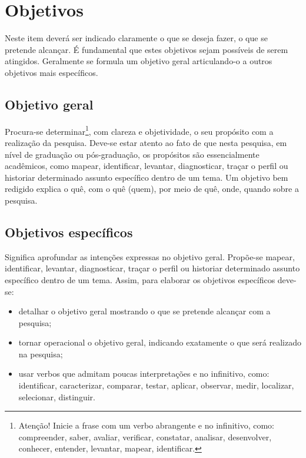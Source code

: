 \section{Objetivos}

Neste item deverá ser indicado claramente o que se deseja fazer, o que se pretende alcançar. É fundamental que estes objetivos sejam possíveis de serem atingidos. Geralmente se formula um objetivo geral articulando-o a outros objetivos mais específicos.

\subsection{Objetivo geral}

Procura-se determinar\footnote{Atenção! Inicie a frase com um verbo abrangente e no infinitivo, como: compreender, saber, avaliar, verificar, constatar, analisar, desenvolver, conhecer, entender, levantar, mapear, identificar.}, com clareza e objetividade, o seu propósito com a realização da pesquisa. Deve-se estar atento ao fato de que nesta pesquisa, em nível de graduação ou pós-graduação, os propósitos são essencialmente acadêmicos, como mapear, identificar, levantar, diagnosticar, traçar o perfil ou historiar determinado assunto específico dentro de um tema. Um objetivo bem redigido explica o quê, com o quê (quem), por meio de quê, onde, quando sobre a pesquisa.

\subsection{Objetivos específicos}

Significa aprofundar as intenções expressas no objetivo geral. Propõe-se mapear, identificar, levantar, diagnosticar, traçar o perfil ou historiar determinado assunto específico dentro de um tema. Assim, para elaborar os objetivos específicos deve-se:

\begin{itemize}
   \item detalhar o objetivo geral mostrando o que se pretende alcançar com a pesquisa;
   \item tornar operacional o objetivo geral, indicando exatamente o que será realizado na pesquisa;
   \item usar verbos que admitam poucas interpretações e no infinitivo, como: identificar, caracterizar, comparar, testar, aplicar, observar, medir, localizar, selecionar, distinguir.
\end{itemize}



